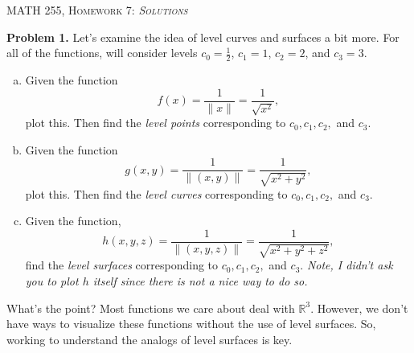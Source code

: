 \documentclass[12pt]{report} %
\newcommand{\R}{\mathbb{R}}
\theoremstyle{definition}
\begin{document}
\begin{center}
   \textsc{\large MATH 255, Homework 7: \emph{Solutions}}\\
\end{center}
\vspace{.5cm}

\noindent\textbf{Problem 1.} Let's examine the idea of level curves and surfaces a bit more.  For all of the functions, will consider levels $c_0 = \frac{1}{2}$, $c_1=1$, $c_2=2$, and $c_3=3$.  
\begin{enumerate}[(a)]
    \item Given the function
    \[
    f(x)=\frac{1}{\|x\|}=\frac{1}{\sqrt{x^2}},
    \]
    plot this.  Then find the \emph{level points} corresponding to $c_0,c_1,c_2,$ and $c_3$.
    \item Given the function
    \[
    g(x,y) = \frac{1}{\|(x,y)\|}=\frac{1}{\sqrt{x^2+y^2}},
    \]
    plot this.  Then find the \emph{level curves} corresponding to $c_0,c_1,c_2,$ and $c_3$.
    \item Given the function,
    \[
    h(x,y,z) = \frac{1}{\|(x,y,z)\|}=\frac{1}{\sqrt{x^2+y^2+z^2}},
    \]
    find the \emph{level surfaces} corresponding to $c_0,c_1,c_2,$ and $c_3$. 
    \emph{Note, I didn't ask you to plot $h$ itself since there is not a nice way to do so.}
\end{enumerate}
What's the point? Most functions we care about deal with $\R^3$.  However, we don't have ways to visualize these functions without the use of level surfaces.  So, working to understand the analogs of level surfaces is key.
\end{document}
